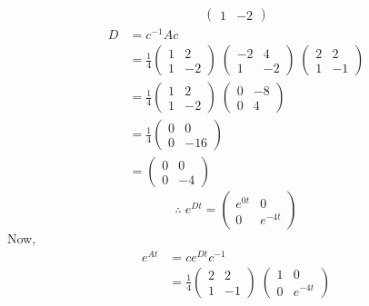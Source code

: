 \documentclass[../main-sheet.tex]{subfiles}
\begin{document}
\begin{soln}
\begin{align*}
\begin{pmatrix}
            1 & -2
        \end{pmatrix}
    \end{align*}
    \begin{align*}
        D&=c^{-1}Ac\\
        &=\frac{1}{4}\begin{pmatrix}
            1 & 2\\
            1 & -2
        \end{pmatrix}\;\begin{pmatrix}
            -2 & 4\\
            1 & -2
        \end{pmatrix}\;\begin{pmatrix}
            2 & 2\\
            1 & -1
        \end{pmatrix}\\
        &=\frac{1}{4}\begin{pmatrix}
            1 & 2\\
            1 & -2
        \end{pmatrix}\;\begin{pmatrix}
            0 & -8\\
            0 & 4
        \end{pmatrix}\\
        &=\frac{1}{4}\begin{pmatrix}
            0 & 0\\
            0 & -16
        \end{pmatrix}\\
        &=\begin{pmatrix}
            0 & 0\\
            0 & -4
        \end{pmatrix}
    \end{align*}
    \[\therefore\; e^{Dt}=\begin{pmatrix}
        e^{0t} & 0\\
        0 & e^{-4t}
    \end{pmatrix}\]
    Now,
    \begin{align*}
        e^{At}&=ce^{Dt}c^{-1}\\
        &=\frac{1}{4}\begin{pmatrix}
            2 & 2\\
            1 & -1
        \end{pmatrix}\;\begin{pmatrix}
            1 & 0\\
            0 & e^{-4t}

\end{pmatrix}
\end{align*}
\end{soln}
\end{document}
